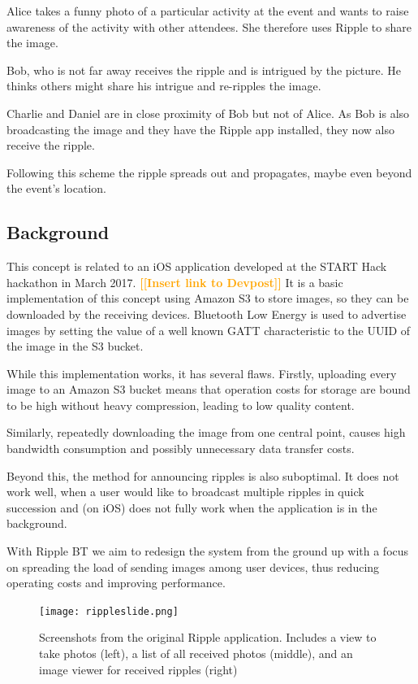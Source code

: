 \documentclass{report}
\newcommand{\todo}[1]{\textsf{\textbf{\textcolor{orange}{[[#1]]}}}}
\newcommand{\lfig}[1]{\label{fig:#1}}
\begin{document}
Alice takes a funny photo of a particular activity at the event and wants to raise awareness of the activity with other attendees. She therefore uses Ripple to share the image.

Bob, who is not far away receives the ripple and is intrigued by the picture. He thinks others might share his intrigue and re-ripples the image.

Charlie and Daniel are in close proximity of Bob but not of Alice. As Bob is also broadcasting the image and they have the Ripple app installed, they now also receive the ripple.

Following this scheme the ripple spreads out and propagates, maybe even beyond the event's location.

\subsection{Background}
This concept is related to an iOS application developed at the START Hack hackathon in March 2017. \todo{Insert link to Devpost} It is a basic implementation of this concept using Amazon S3 to store images, so they can be downloaded by the receiving devices. Bluetooth Low Energy is used to advertise images by setting the value of a well known GATT characteristic to the UUID of the image in the S3 bucket.

While this implementation works, it has several flaws. Firstly, uploading every image to an Amazon S3 bucket means that operation costs for storage are bound to be high without heavy compression, leading to low quality content.

Similarly, repeatedly downloading the image from one central point, causes high bandwidth consumption and possibly unnecessary data transfer costs.

Beyond this, the method for announcing ripples is also suboptimal. It does not work well, when a user would like to broadcast multiple ripples in quick succession and (on iOS) does not fully work when the application is in the background.

With Ripple BT we aim to redesign the system from the ground up with a focus on spreading the load of sending images among user devices, thus reducing operating costs and improving performance.

\begin{figure}[h]
	\centering
    \texttt{[image: rippleslide.png]}
    \lfig{example}
    \vspace{-5mm} %
	\caption{Screenshots from the original Ripple application. Includes a view to take photos (left), a list of all received photos (middle), and an image viewer for received ripples (right)}
\end{figure}
\end{document}
